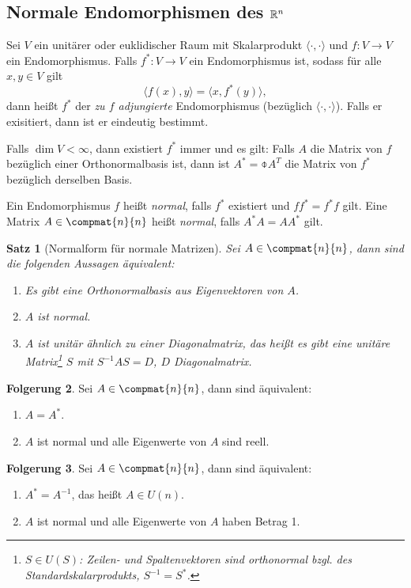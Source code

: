 \documentclass[
 a4paper,
 12pt,
 parskip=half
 ]{scrartcl}
\theoremstyle{plain}
\newtheorem{thm}{Satz}[section] %
\theoremstyle{definition}
\newtheorem{folg}[thm]{Folgerung} %
\numberwithin{equation}{section}
\begin{document}
\subsection*{Normale Endomorphismen des $\mathbb{R}^n$}
\begin{mydef}
Sei $V$ ein unitärer oder euklidischer Raum mit Skalarprodukt $\langle \cdot, \cdot \rangle$ und $f:V \to V$ ein Endomorphismus. Falls $f^*:V \to V$ ein Endomorphismus ist, sodass für alle $x,y \in V$ gilt
\[ \langle f(x), y \rangle = \langle x, f^*(y) \rangle, \]
dann heißt $f^*$ der \emph{zu $f$ adjungierte} Endomorphismus (bezüglich $\langle \cdot, \cdot \rangle$). Falls er exisitiert, dann ist er eindeutig bestimmt.

Falls $\dim V < \infty$, dann existiert $f^*$ immer und es gilt: Falls $A$ die Matrix von $f$ bezüglich einer Orthonormalbasis ist, dann ist $A^* = \obar{A}^T$ die Matrix von $f^*$ bezüglich derselben Basis.

Ein Endomorphismus $f$ heißt \emph{normal}, falls $f^*$ existiert und $f f^* = f^* f$ gilt. Eine Matrix $A \in \compmat{n}{n}$ heißt \emph{normal}, falls $A^* A = A A^*$ gilt.
\end{mydef}

\begin{thm}[Normalform für normale Matrizen]
 Sei $A \in \compmat{n}{n}$, dann sind die folgenden Aussagen äquivalent:
 \begin{enumerate}[(1)]
  \item Es gibt eine Orthonormalbasis aus Eigenvektoren von $A$.
  \item $A$ ist normal.
  \item $A$ ist unitär ähnlich zu einer Diagonalmatrix, das heißt es gibt eine unitäre Matrix\footnote{$S \in U(S)$: Zeilen- und Spaltenvektoren sind orthonormal bzgl. des Standardskalarprodukts, $S^{-1} = S^*$.} $S$ mit $S^{-1} A S = D$, $D$ Diagonalmatrix.
 \end{enumerate}
\end{thm}

\begin{folg}
 Sei $A \in \compmat{n}{n}$, dann sind äquivalent:
 \begin{enumerate}[(1)]
  \item $A = A^*$.
  \item $A$ ist normal und alle Eigenwerte von $A$ sind reell.
 \end{enumerate}
\end{folg}

\begin{folg}
 Sei $A \in \compmat{n}{n}$, dann sind äquivalent:
 \begin{enumerate}[(1)]
  \item $A^* = A^{-1}$, das heißt $A \in U(n)$.
  \item $A$ ist normal und alle Eigenwerte von $A$ haben Betrag 1.
 \end{enumerate}
\end{folg}
\end{document}
